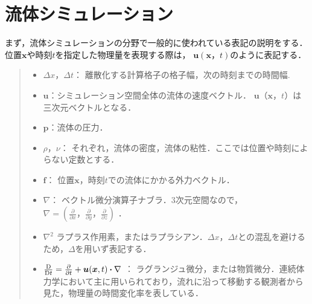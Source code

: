 \documentclass[a4j,12pt]{jreport}
\begin{document}
	\section{流体シミュレーション}\label{sec:fractional}
		まず，流体シミュレーションの分野で一般的に使われている表記の説明をする．位置$\bm{x}$や時刻$t$を指定した物理量を表現する際は，
		$\bm{u}(\bm{x}，t)$のように表記する．
		\begin{quote}
		\begin{itemize}
		\item $\varDelta x，\varDelta t：$ 離散化する計算格子の格子幅，次の時刻までの時間幅.
		\item $\bm{u}$：シミュレーション空間全体の流体の速度ベクトル．
		$\bm{u}（\bm{x}，t）$は三次元ベクトルとなる．
		\item $\bm{p}$：流体の圧力．
		\item $\rho，\nu：$ それぞれ，流体の密度，流体の粘性．ここでは位置や時刻によらない定数とする．
		\item $\bm{f}：$ 位置$\bm{x}$，時刻$t$での流体にかかる外力ベクトル．
		\item $\nabla：$ ベクトル微分演算子ナブラ．3次元空間なので，$\nabla=  (\frac{\partial}{\partial x}，\frac{\partial}{\partial y}，\frac{\partial}{\partial z}) $ ．
		\item $\nabla^2$ ラプラス作用素，またはラプラシアン．$\varDelta x，\varDelta t$との混乱を避けるため，$\Delta$を用いず表記する．
		\item $\frac{{\rm{D}}}{{\rm{D}}t} =\frac{\partial}{\partial t} + \bm{u} (\bm{x},t)  \boldsymbol{\cdot}\nabla$ ：
		ラグランジュ微分，または物質微分．連続体力学において主に用いられており，流れに沿って移動する観測者から見た，物理量の時間変化率を表している．
	\end{itemize}
	\end{quote}
\end{document}
